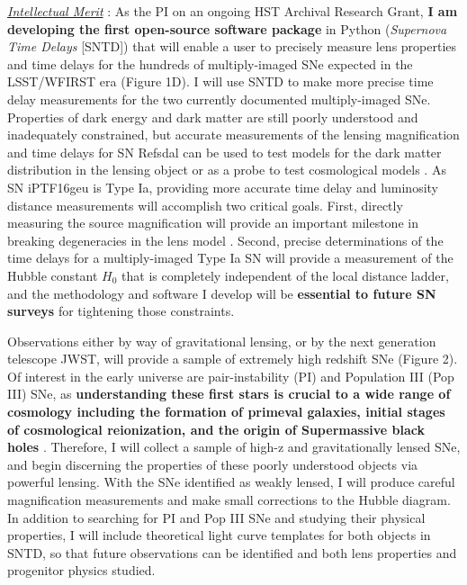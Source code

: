 \noindent\underline{\textit{Intellectual Merit}} :
As the PI on an ongoing HST Archival Research Grant, \textbf{I am
developing the first open-source software package} in Python
(\textit{Supernova Time Delays} [SNTD]) that will enable a user to
precisely measure lens properties and time delays for the hundreds of
multiply-imaged SNe expected in the LSST/WFIRST era (Figure 1D). I
will use SNTD to make more precise time delay measurements for the two
currently documented multiply-imaged SNe. Properties of dark energy
and dark matter are still poorly understood and inadequately
constrained, but accurate measurements of the lensing magnification and
time delays for SN Refsdal can be used to test models for the dark
matter distribution in the lensing
object \cite{Rodney:2015a,Rodney:2016} or as a probe to test
cosmological models \cite{Suyu:2014}. As SN iPTF16geu is Type Ia,
providing more accurate time delay and luminosity distance
measurements will accomplish two critical goals. First, directly
measuring the source magnification will provide an important milestone
in breaking degeneracies in the lens
model \cite{Kolatt:1998,Oguri:2003b}. Second, precise determinations
of the time delays for a multiply-imaged Type Ia SN will provide a
measurement of the Hubble constant $H_0$ that is completely independent of the local
distance ladder, and the methodology and software I develop will
be \textbf{essential to future SN surveys} for tightening those
constraints.

Observations either by way of gravitational lensing, or by the next
generation telescope JWST, will provide a sample of extremely high
redshift SNe (Figure 2). Of interest in the early universe are
pair-instability (PI) and Population III (Pop III) SNe,
as \textbf{understanding these first stars is crucial to a wide range
of cosmology including the formation of primeval galaxies, initial
stages of cosmological reionization, and the origin of Supermassive
black holes} \cite{Whalen:2013}. Therefore, I will collect a sample
of high-z and gravitationally lensed SNe, and begin discerning
the properties of these poorly understood objects via powerful
lensing. With the SNe identified as weakly lensed, I will produce
careful magnification measurements and make small corrections
to the Hubble diagram. In addition to searching for PI and Pop III SNe
and studying their physical properties, I will include theoretical
light curve templates for both objects in SNTD, so that future
observations can be identified and both lens properties and progenitor
physics studied.

